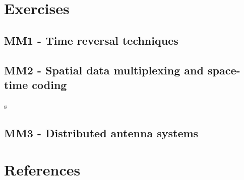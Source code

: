 



    \singlespacing
    \pagestyle{empty}	
	
	\cleardoublepage
	
	\pagestyle{plain}
		
	\tableofcontents 
	\onehalfspacing
	\pagestyle{fancy} %
    \setcounter{page}{0} %

\part{Exercises}

\chapter{MM1 - Time reversal techniques}






\chapter{MM2 - Spatial data multiplexing and space-time coding}


s



\chapter{MM3 - Distributed antenna systems}









\part{References}



%


